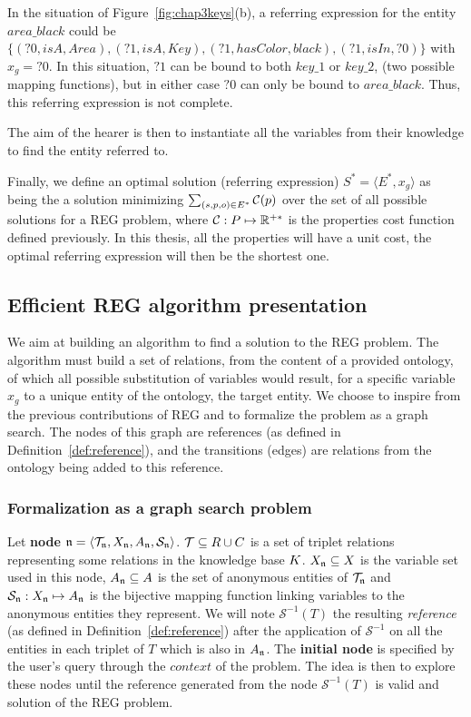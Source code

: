 \documentclass[a4paper,11pt,twoside]{StyleThese}
\begin{document}
In the situation of Figure~\ref{fig:chap3keys}(b), a referring expression for the entity $area\_black$ could be $\{(?0, isA, Area), (?1, isA, Key), (?1, hasColor, black), (?1, isIn, ?0)\}$ with $x_g = ?0$. In this situation, $?1$ can be bound to both $key\_1$ or $key\_2$, (two possible mapping functions), but in either case $?0$ can only be bound to $area\_black$. Thus, this referring expression is not complete.

The aim of the hearer is then to instantiate all the variables from their knowledge to find the entity referred to.

Finally, we define an optimal solution (referring expression) $S^* = \langle E^*, x_g \rangle$ as being the a solution minimizing $\sum_{(s, p, o) \in E^*}\mathcal{C}(p)$ over the set of all possible solutions for a REG problem, where $\mathcal{C}: P \mapsto \mathbb{R}^{+*}$ is the properties cost function defined previously. In this thesis, all the properties will have a unit cost, the optimal referring expression will then be the shortest one.


\subsection{Efficient REG algorithm presentation}
We aim at building an algorithm to find a solution to the REG problem. The algorithm must build a set of relations, from the content of a provided ontology, of which all possible substitution of variables would result, for a specific variable $x_g$ to a unique entity of the ontology, the target entity. We choose to inspire from the previous contributions of REG and to formalize the problem as a graph search. The nodes of this graph are references (as defined in Definition~\ref{def:reference}), and the transitions (edges) are relations from the ontology being added to this reference.

\subsubsection{Formalization as a graph search problem}
\label{sec:SCFormalisation}

Let \textbf{node} $\mathfrak{n} = \langle \mathcal{T}_{\mathfrak{n}}, X_{\mathfrak{n}}, A_{\mathfrak{n}}, \mathcal{S}_{\mathfrak{n}} \rangle$. $\mathcal{T} \subseteq R \cup C$ is a set of triplet relations representing some relations in the knowledge base $K$. $X_{\mathfrak{n}} \subseteq X$ is the variable set used in this node, $A_{\mathfrak{n}} \subseteq A$ is the set of anonymous entities of $\mathcal{T}_{\mathfrak{n}}$ and $\mathcal{S}_{\mathfrak{n}}: X_{\mathfrak{n}} \mapsto A_{\mathfrak{n}}$ is the bijective mapping function linking variables to the anonymous entities they represent. We will note $\mathcal{S}^{-1}(T)$ the resulting \textit{reference} (as defined in Definition~\ref{def:reference}) after the application of $\mathcal{S}^{-1}$ on all the entities in each triplet of $T$ which is also in $A_{\mathfrak{n}}$.
The \textbf{initial node} is specified by the user's query through the $context$ of the problem.
The idea is then to explore these nodes until the reference generated from the node $\mathcal{S}^{-1}(T)$ is valid and solution of the REG problem.
 
\end{document}
